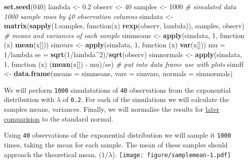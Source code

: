 \documentclass[legalpaper,11pt]{article}
\newenvironment{Shaded}{\begin{snugshade}}{\end{snugshade}}
\newcommand{\KeywordTok}[1]{\textcolor[rgb]{0.13,0.29,0.53}{\textbf{{#1}}}}
\newcommand{\DataTypeTok}[1]{\textcolor[rgb]{0.13,0.29,0.53}{{#1}}}
\newcommand{\DecValTok}[1]{\textcolor[rgb]{0.00,0.00,0.81}{{#1}}}
\newcommand{\FloatTok}[1]{\textcolor[rgb]{0.00,0.00,0.81}{{#1}}}
\newcommand{\StringTok}[1]{\textcolor[rgb]{0.31,0.60,0.02}{{#1}}}
\newcommand{\CommentTok}[1]{\textcolor[rgb]{0.56,0.35,0.01}{\textit{{#1}}}}
\newcommand{\NormalTok}[1]{{#1}}
\begin{document}
\begin{Shaded}
\begin{Highlighting}[]
\KeywordTok{set.seed}\NormalTok{(}\DecValTok{040}\NormalTok{)}
\NormalTok{lambda <-}\StringTok{ }\FloatTok{0.2}
\NormalTok{observ <-}\StringTok{ }\DecValTok{40}
\NormalTok{samples <-}\StringTok{ }\DecValTok{1000}
\CommentTok{# simulated data 1000 sample rows by 40 observation columns}
\NormalTok{simdata <-}\StringTok{ }\KeywordTok{matrix}\NormalTok{(}\KeywordTok{sapply}\NormalTok{(}\DecValTok{1}\NormalTok{:samples, function(x) }\KeywordTok{rexp}\NormalTok{(observ, lambda)), samples, observ)}
\CommentTok{# means and variances of each sample}
\NormalTok{simmeans <-}\StringTok{ }\KeywordTok{apply}\NormalTok{(simdata, }\DecValTok{1}\NormalTok{, function (x) }\KeywordTok{mean}\NormalTok{(x[]))}
\NormalTok{simvars <-}\StringTok{ }\KeywordTok{apply}\NormalTok{(simdata, }\DecValTok{1}\NormalTok{, function (x) }\KeywordTok{var}\NormalTok{(x[]))}
\NormalTok{mu =}\StringTok{ }\DecValTok{1}\NormalTok{/lambda}
\NormalTok{se =}\StringTok{ }\KeywordTok{sqrt}\NormalTok{(}\DecValTok{1}\NormalTok{/lambda^}\DecValTok{2}\NormalTok{)/}\KeywordTok{sqrt}\NormalTok{(observ)}
\NormalTok{simnormals <-}\StringTok{ }\KeywordTok{apply}\NormalTok{(simdata, }\DecValTok{1}\NormalTok{, function (x) (}\KeywordTok{mean}\NormalTok{(x[]) -}\StringTok{ }\NormalTok{mu)/se)}
\CommentTok{# put into data frame use with plots}
\NormalTok{simdf <-}\StringTok{ }\KeywordTok{data.frame}\NormalTok{(}\DataTypeTok{means =} \NormalTok{simmeans, }\DataTypeTok{vars =} \NormalTok{simvars, }\DataTypeTok{normals =} \NormalTok{simnormals)}
\end{Highlighting}
\end{Shaded}

We will perform \texttt{1000} simulatations of \texttt{40} observations
from the exponential distribution with \(\lambda\) of \texttt{0.2}. For
each of the simulations we will calculate the samples means, variances.
Finally, we will normalise the results for
\hyperref[distribution-is-approximately-normal]{later comparision} to
the standard normal.


Using \texttt{40} observations of the exponential distribution we will
sample it \texttt{1000} times, taking the mean for each sample. The mean
of these samples should approach the theoretical mean, (\(1/\lambda\)).
\texttt{[image: figure/samplemean-1.pdf]}
\end{document}

